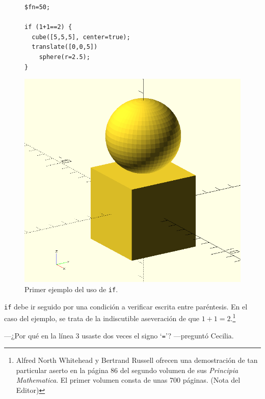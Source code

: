 \begin{figure}[ht]
\begin{minipage}[]{.5\textwidth}%
    \begin{lstlisting}
$fn=50;

if (1+1==2) {
  cube([5,5,5], center=true);
  translate([0,0,5])
    sphere(r=2.5);
}
\end{lstlisting}%
\end{minipage}
\begin{minipage}[]{.49\textwidth}%

  \centering
  \includegraphics[width=.7\textwidth]{imagenes/if-1}
  \end{minipage}
  \caption{Primer ejemplo del uso de \lstinline!if!.}
  \label{fig:if-1}
\end{figure}


\guillemotright \lstinline!if! debe ir seguido por una condición a
verificar escrita entre paréntesis. En el caso del ejemplo, se trata
de la indiscutible aseveración de que $1+1=2$.\footnote{Alfred North
  Whitehead y Bertrand Russell ofrecen una demostración de tan
  particular aserto en la página 86 del segundo volumen de sus
  \emph{Principia Mathematica}. El primer volumen consta de unas 700
  páginas. (Nota del Editor)}

---¿Por qué en la línea 3 usaste dos veces el signo `\texttt{=}'?
---pre\-gun\-tó Cecilia.


